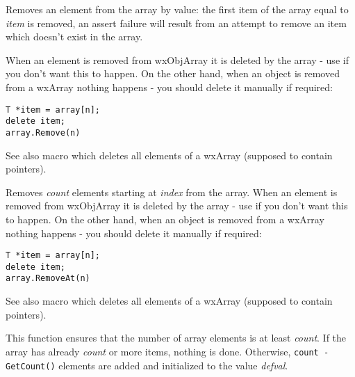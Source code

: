
Removes an element from the array by value: the first item of the
array equal to {\it item} is removed, an assert failure will result from an
attempt to remove an item which doesn't exist in the array.

When an element is removed from wxObjArray it is deleted by the array - use
 if you don't want this to happen. On the
other hand, when an object is removed from a wxArray nothing happens - you
should delete it manually if required:

\begin{verbatim}
T *item = array[n];
delete item;
array.Remove(n)
\end{verbatim}

See also  macro which deletes all
elements of a wxArray (supposed to contain pointers).

\label{wxarrayremoveat}


Removes {\it count} elements starting at {\it index} from the array. When an
element is removed from wxObjArray it is deleted by the array - use
 if you don't want this to happen. On
the other hand, when an object is removed from a wxArray nothing happens -
you should delete it manually if required:

\begin{verbatim}
T *item = array[n];
delete item;
array.RemoveAt(n)
\end{verbatim}

See also  macro which deletes all
elements of a wxArray (supposed to contain pointers).

\label{wxarraysetcount}


This function ensures that the number of array elements is at least
{\it count}. If the array has already {\it count} or more items, nothing is
done. Otherwise, {\tt count - GetCount()} elements are added and initialized to
the value {\it defval}.



